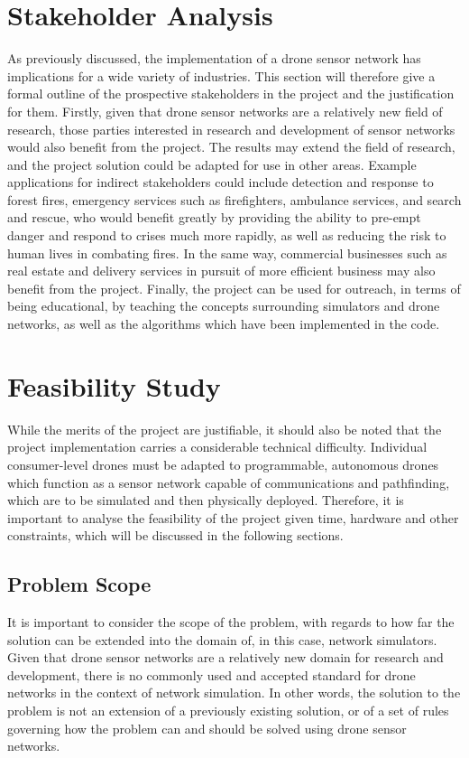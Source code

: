 \section{Stakeholder Analysis}
As previously discussed, the implementation of a drone sensor network has implications for a wide variety of industries. This section will therefore give a formal outline of the prospective stakeholders in the project and the justification for them. Firstly, given that drone sensor networks are a relatively new field of research, those parties interested in research and development of sensor networks would also benefit from the project. The results may extend the field of research, and the project solution could be adapted for use in other areas.  Example applications for indirect stakeholders could include detection and response to forest fires, emergency services such as firefighters, ambulance services, and search and rescue, who would benefit greatly by providing the ability to pre-empt danger and respond to crises much more rapidly, as well as reducing the risk to human lives in combating fires. In the same way, commercial businesses such as real estate and delivery services in pursuit of more efficient business may also benefit from the project. Finally, the project can be used for outreach, in terms of being educational, by teaching the concepts surrounding simulators and drone networks, as well as the algorithms which have been implemented in the code.

\section{Feasibility Study}
While the merits of the project are justifiable, it should also be noted that the project implementation carries a considerable technical difficulty.  Individual consumer-level drones must be adapted to programmable, autonomous drones which function as a sensor network capable of communications and pathfinding, which are to be simulated and then physically deployed. Therefore, it is important to analyse the feasibility of the project given time, hardware and other constraints, which will be discussed in the following sections.

\subsection{Problem Scope}
It is important to consider the scope of the problem, with regards to how far the solution can be extended into the domain of, in this case, network simulators. Given that drone sensor networks are a relatively new domain for research and development, there is no commonly used and accepted standard for drone networks in the context of network simulation. In other words, the solution to the problem is not an extension of a previously existing solution, or of a set of rules governing how the problem can and should be solved using drone sensor networks.

